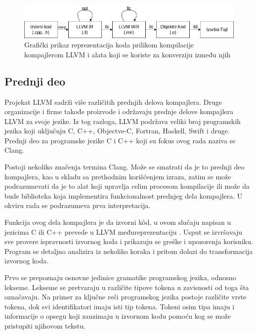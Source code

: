 \documentclass[12pt,oneside]{memoir}
\begin{document}
\begin{figure}[!ht]
  \centering
  \includegraphics[width=\textwidth]{assets/llvm_compile_tools.png}
  \caption{Grafički prikaz reprezentacija koda prilikom kompilacije kompajlerom LLVM i alata koji se koriste za konverziju između njih}
  \label{fig:llvm_compile_tools}
\end{figure}


\subsection{Prednji deo}

Projekat LLVM sadrži više različitih prednjih delova kompajlera.
Druge organizacije i firme takođe proizvode i održavaju prednje delove kompajlera LLVM za svoje jezike.
Iz tog razloga, LLVM podržava veliki broj programskih jezika koji uključuju C, C++, Objectve-C, Fortran, Haskell, Swift i druge.
Prednji deo za programske jezike C i C++ koji su fokus ovog rada naziva se Clang.

Postoji nekoliko značenja termina Clang.
Može se smatrati da je to prednji deo kompajlera, kao u skladu sa prethodnim korišćenjem izraza, zatim se može podrazumevati da je to alat koji upravlja celim procesom kompilacije ili može da bude biblioteka koja implementira funkcionalnost prednjeg dela kompajlera.
U okviru rada se podrazumeva prva interpretacija.

Funkcija ovog dela kompajlera je da izvorni k\^od, u ovom slučaju napisan u jezicima C ili C++ prevede u LLVM međureprezentaciju \cite{lopes2014llvmcorelibs}.
Usput se izvršavaju sve provere ispravnosti izvornog koda i prikazuju se greške i upozorenja korisniku.
Program se detaljno analizira iz nekoliko koraka i pritom dolazi do transformacija izvornog koda.

Prvo se prepoznaju osnovne jedinice gramatike programskog jezika, odnosno lekseme.
Lekseme se pretvaraju u različite tipove tokena u zavisnosti od toga šta označavaju.
Na primer za ključne reči programskog jezika postoje različite vrste tokena, dok svi identifikatori imaju isti tip tokena.
Tokeni osim tipa imaju i informacije o opsegu koji zauzimaju u izvornom kodu pomoću kog se može pristupiti njihovom tekstu.
\end{document}
